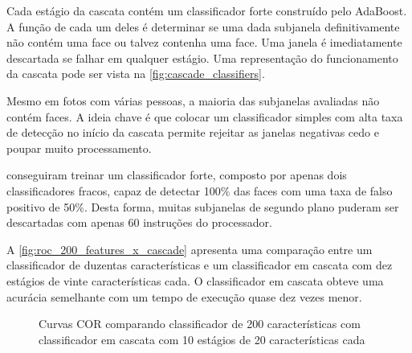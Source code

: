 Cada estágio da cascata contém um classificador forte construído pelo AdaBoost. A função de cada um deles é determinar se uma dada subjanela definitivamente não contém uma face ou talvez contenha uma face. Uma janela é imediatamente descartada se falhar em qualquer estágio. Uma representação do funcionamento da cascata pode ser vista na \autoref{fig:cascade_classifiers}.

Mesmo em fotos com várias pessoas, a maioria das subjanelas avaliadas não contém faces. A ideia chave é que colocar um classificador simples com alta taxa de detecção no início da cascata permite rejeitar as janelas negativas cedo e poupar muito processamento.

 conseguiram treinar um classificador forte, composto por apenas dois classificadores fracos, capaz de detectar 100\% das faces com uma taxa de falso positivo de 50\%. Desta forma, muitas subjanelas de segundo plano puderam ser descartadas com apenas 60 instruções do processador.

A \autoref{fig:roc_200_features_x_cascade} apresenta uma comparação entre um classificador de duzentas características e um classificador em cascata com dez estágios de vinte características cada. O classificador em cascata obteve uma acurácia semelhante com um tempo de execução quase dez vezes menor.


\begin{figure}[htbp]
   \caption{Curvas COR comparando classificador de 200 características com classificador em cascata com 10 estágios de 20 características cada}
   \label{fig:roc_200_features_x_cascade}
   \begin{center}
   \end{center}
\end{figure}


